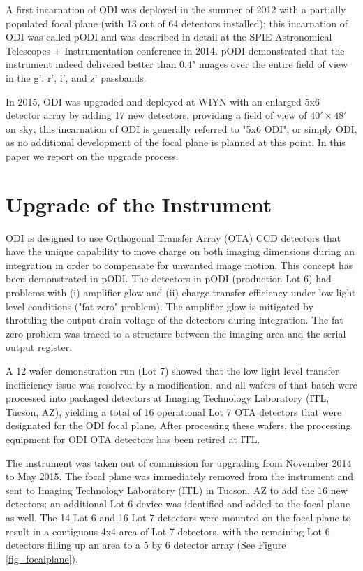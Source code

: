\documentclass[]{spieman}
\begin{document}
A first incarnation of ODI was deployed in the summer of 2012 with a partially populated
focal plane (with 13 out of 64 detectors installed); this incarnation of ODI was
called pODI and was described in detail at the SPIE Astronomical Telescopes +
Instrumentation conference in 2014\cite{harbeck2014}. pODI demonstrated that the
instrument indeed delivered better than 0.4" images over the entire field of view
in the g', r', i', and z' passbands.

In 2015, ODI was upgraded and deployed at WIYN  with an enlarged 5x6  detector
array by adding 17 new detectors, providing a field of view of $40' \times 48'$ 
on sky; this incarnation  of ODI is generally  referred to "5x6 ODI", or simply
ODI, as no additional development of the focal plane is planned at this point. 
In this paper we report on the upgrade process.


\section{Upgrade of the Instrument} 

ODI is designed to use Orthogonal Transfer Array (OTA) CCD detectors that have
the unique capability to move charge on both imaging dimensions during an
integration in order to compensate for unwanted image motion. This concept has
been demonstrated in pODI.  The detectors in pODI (production Lot 6) had
problems with (i) amplifier glow and (ii)  charge transfer efficiency under low
light level conditions ("fat zero" problem). The amplifier glow is mitigated by
throttling the output drain voltage of the detectors during integration. The fat
zero problem was traced to a structure between the imaging area and the serial
output register.

A  12 wafer demonstration run (Lot 7) showed that the low light level transfer
inefficiency issue was resolved by a modification\cite{harbeck2014}, and all
wafers of that batch were processed into packaged detectors at Imaging
Technology Laboratory (ITL, Tucson, AZ),  yielding a total of 16 operational 
Lot 7 OTA detectors that were designated for the ODI focal plane. After 
processing these wafers, the processing equipment for ODI OTA detectors has been
retired at ITL.

The instrument was taken out of commission for upgrading from November 2014 to
May 2015. The focal plane was immediately removed from the instrument and sent
to  Imaging Technology Laboratory  (ITL) in Tucson, AZ to add the 16 new
detectors; an additional Lot 6 device was identified and added to the focal
plane as well. The 14 Lot 6 and 16 Lot 7 detectors were mounted on the focal
plane to result in a contiguous 4x4 area of Lot 7 detectors, with the remaining
Lot 6 detectors filling up an area to a 5 by 6 detector array (See Figure
\ref{fig_focalplane}).
\end{document}
